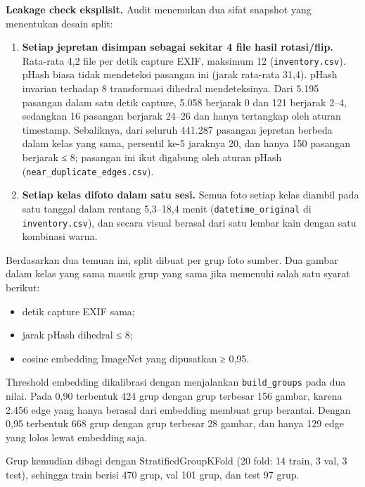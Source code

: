 \documentclass[10pt,a4paper]{article}
\providecommand{\tightlist}{\setlength{\itemsep}{2pt}\setlength{\parskip}{0pt}}
\begin{document}
\textbf{Leakage check eksplisit.} Audit menemukan dua sifat snapshot yang menentukan
desain split:

\begin{enumerate}
\def\labelenumi{\arabic{enumi}.}
\tightlist
\item
  \textbf{Setiap jepretan disimpan sebagai sekitar 4 file hasil rotasi/flip.} Rata-rata
  4,2 file per detik capture EXIF, maksimum 12 (\texttt{inventory.csv}). pHash biasa tidak
  mendeteksi pasangan ini (jarak rata-rata 31,4). pHash invarian terhadap 8 transformasi
  dihedral mendeteksinya. Dari 5.195 pasangan dalam satu detik capture, 5.058 berjarak 0
  dan 121 berjarak 2--4, sedangkan 16 pasangan berjarak 24--26 dan hanya tertangkap oleh
  aturan timestamp. Sebaliknya, dari seluruh 441.287 pasangan jepretan berbeda dalam
  kelas yang sama, persentil ke-5 jaraknya 20, dan hanya 150 pasangan berjarak ≤ 8;
  pasangan ini ikut digabung oleh aturan pHash (\texttt{near\_\allowbreak{}duplicate\_\allowbreak{}edges.csv}).
\item
  \textbf{Setiap kelas difoto dalam satu sesi.} Semua foto setiap kelas diambil pada satu
  tanggal dalam rentang 5,3--18,4 menit (\texttt{datetime\_\allowbreak{}original} di \texttt{inventory.csv}), dan
  secara visual berasal dari satu lembar kain dengan satu kombinasi warna.
\end{enumerate}

Berdasarkan dua temuan ini, split dibuat per grup foto sumber. Dua gambar dalam kelas yang sama masuk grup
yang sama jika memenuhi salah satu syarat berikut:

\begin{itemize}
\tightlist
\item
  detik capture EXIF sama;
\item
  jarak pHash dihedral ≤ 8;
\item
  cosine embedding ImageNet yang dipusatkan ≥ 0,95.
\end{itemize}

Threshold embedding dikalibrasi dengan menjalankan \texttt{build\_\allowbreak{}groups} pada dua nilai. Pada
0,90 terbentuk 424 grup dengan grup terbesar 156 gambar, karena 2.456 edge yang hanya
berasal dari embedding membuat grup berantai. Dengan 0,95 terbentuk 668 grup dengan grup
terbesar 28 gambar, dan hanya 129 edge yang lolos lewat embedding saja.

Grup kemudian dibagi dengan StratifiedGroupKFold (20 fold: 14 train, 3 val, 3 test), sehingga
train berisi 470 grup, val 101 grup, dan test 97 grup.
\end{document}
